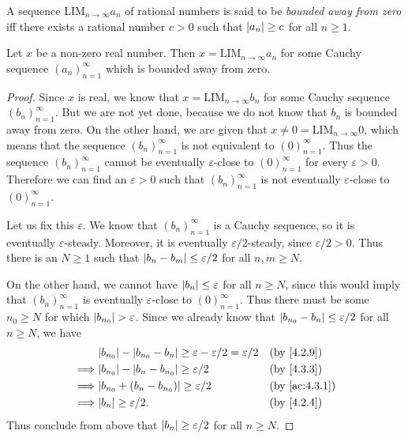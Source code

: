 \begin{defn}\label{5.3.12}
  A sequence \(\text{LIM}_{n \to \infty} a_n\) of rational numbers is said to be \emph{bounded away from zero} iff there exists a rational number \(c > 0\) such that \(\left\lvert a_n\right\rvert \geq c\) for all \(n \geq 1\).
\end{defn}

\setcounter{thm}{13}
\begin{lem}\label{5.3.14}
  Let \(x\) be a non-zero real number.
  Then \(x = \text{LIM}_{n \to \infty} a_n\) for some Cauchy sequence \((a_n)_{n = 1}^{\infty}\) which is bounded away from zero.
\end{lem}

\begin{proof}
  Since \(x\) is real, we know that \(x = \text{LIM}_{n \to \infty} b_n\) for some Cauchy sequence \((b_n)_{n = 1}^{\infty}\).
  But we are not yet done, because we do not know that \(b_n\) is bounded away from zero.
  On the other hand, we are given that \(x \neq 0 = \text{LIM}_{n \to \infty} 0\), which means that the sequence \((b_n)_{n = 1}^{\infty}\) is not equivalent to \((0)_{n = 1}^{\infty}\).
  Thus the sequence \((b_n)_{n = 1}^{\infty}\) cannot be eventually \(\varepsilon\)-close to \((0)_{n = 1}^{\infty}\) for every \(\varepsilon > 0\).
  Therefore we can find an \(\varepsilon > 0\) such that \((b_n)_{n = 1}^{\infty}\) is not eventually \(\varepsilon\)-close to \((0)_{n = 1}^{\infty}\).

  Let us fix this \(\varepsilon\).
  We know that \((b_n)_{n = 1}^{\infty}\) is a Cauchy sequence, so it is eventually \(\varepsilon\)-steady.
  Moreover, it is eventually \(\varepsilon / 2\)-steady, since \(\varepsilon / 2 > 0\).
  Thus there is an \(N \geq 1\) such that \(\left\lvert b_n - b_m\right\rvert \leq \varepsilon / 2\) for all \(n, m \geq N\).

  On the other hand, we cannot have \(\left\lvert b_n\right\rvert \leq \varepsilon\) for all \(n \geq N\), since this would imply that \((b_n)_{n = 1}^{\infty}\) is eventually \(\varepsilon\)-close to \((0)_{n = 1}^{\infty}\).
  Thus there must be some \(n_0 \geq N\) for which \(\left\lvert b_{n_0}\right\rvert > \varepsilon\).
  Since we already know that \(\left\lvert b_{n_0} - b_n\right\rvert \leq \varepsilon / 2\) for all \(n \geq N\), we have
  \begin{align*}
             & \abs{b_{n_0}} - \abs{b_{n_0} - b_n} \geq \varepsilon - \varepsilon / 2 = \varepsilon / 2 &  & \text{(by \cref{4.2.9})}    \\
    \implies & \abs{b_{n_0}} - \abs{b_n - b_{n_0}} \geq \varepsilon / 2                                 &  & \text{(by \cref{4.3.3})}    \\
    \implies & \abs{b_{n_0} + (b_n - b_{n_0})} \geq \varepsilon / 2                                     &  & \text{(by \cref{ac:4.3.1})} \\
    \implies & \abs{b_n} \geq \varepsilon / 2.                                                          &  & \text{(by \cref{4.2.4})}    \\
  \end{align*}
  Thus conclude from above that \(\left\lvert b_n\right\rvert \geq \varepsilon / 2\) for all \(n \geq N\).


\end{proof}
